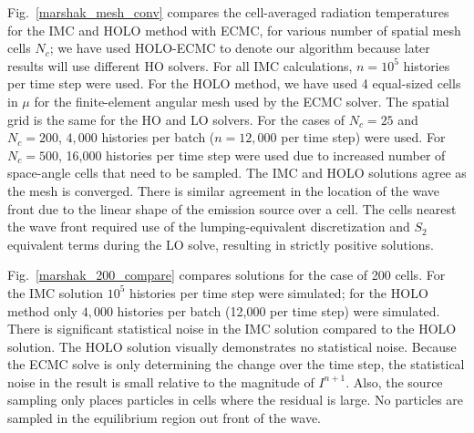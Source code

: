 \documentclass[12pt]{article}
\begin{document}
\begin{center}
Fig.~\ref{marshak_mesh_conv} compares the cell-averaged radiation temperatures  for the
IMC and HOLO method with ECMC, for various number of spatial mesh cells $N_c$; we
have used HOLO-ECMC to denote our algorithm because later results will use different HO solvers.   For
all IMC calculations, $n=10^5$ histories per time step were used.  For the HOLO method, we have used
4 equal-sized cells in $\mu$ for the finite-element angular mesh used by the ECMC
solver.  The spatial grid is the same for the HO and LO solvers. For the cases
of $N_c=25$ and $N_c=200$, $4,000$ histories per batch ($n=12,000$ per time step)
were used.  For $N_c=500$, 16,000 histories per time step were used due to increased
number of space-angle cells that
need to be sampled. The IMC and HOLO solutions agree as the mesh is converged.  There is
similar agreement in the location of the wave front due to the linear shape of the emission source over a cell.  The cells
nearest the wave front required use of the lumping-equivalent discretization and
$S_2$ equivalent terms during the LO
solve, resulting in strictly positive solutions.
 
Fig.~\ref{marshak_200_compare} compares solutions
for the case of 200 cells.  For the IMC solution $10^5$ histories per time step were
simulated; for the HOLO method only $4,000$ histories per batch
(12,000 per time step) were simulated. There is significant statistical noise in the IMC solution
compared to the HOLO solution.  The HOLO solution visually demonstrates no
statistical noise.  Because the ECMC solve is only determining the change over the
time step, the statistical noise in the result is small relative to the magnitude of
$I^{n+1}$.  Also, the source sampling only places particles in cells where the residual is
large.  No particles are sampled in the equilibrium region out front of the wave. 


\end{center}
\end{document}
